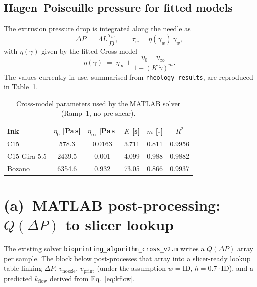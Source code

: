 \documentclass[11pt,a4paper]{article}
\begin{document}
\subsection{Hagen--Poiseuille pressure for fitted models}
The extrusion pressure drop is integrated along the needle as
\begin{equation}
\Delta P \;=\; 4 L \frac{\tau_w}{D}, \qquad
\tau_w = \eta(\dot\gamma_w)\,\dot\gamma_w,
\label{eq:HP}
\end{equation}
with $\eta(\dot\gamma)$ given by the fitted Cross model
\begin{equation}
\eta(\dot\gamma) \;=\; \eta_\infty + \frac{\eta_0-\eta_\infty}{1+(K\,\dot\gamma)^{m}}.
\label{eq:cross}
\end{equation}
The values currently in use, summarised from
\texttt{rheology\_results}, are reproduced in Table~\ref{tab:rheo_params}.

\begin{table}[h]
\centering
\small
\caption{Cross-model parameters used by the MATLAB solver (Ramp~1, no pre-shear).}
\label{tab:rheo_params}
\begin{tabular}{l c c c c c}
\toprule
Ink & $\eta_0$ [Pa\,s] & $\eta_\infty$ [Pa\,s] & $K$ [s] & $m$ [-] & $R^2$ \\
\midrule
C15            & 578.3   & 0.0163 & 3.711  & 0.811 & 0.9956 \\
C15 Gira 5.5   & 2439.5  & 0.001  & 4.099  & 0.988 & 0.9882 \\
Bozano         & 6354.6  & 0.932  & 73.05  & 0.866 & 0.9937 \\
\bottomrule
\end{tabular}
\end{table}

\section{(a)~MATLAB post-processing: \texorpdfstring{$Q(\Delta P)$}{Q(dP)} to slicer lookup}
\label{sec:matlab}

The existing solver \texttt{bioprinting\_algorithm\_cross\_v2.m} writes a
$Q(\Delta P)$ array per sample. The block below post-processes that array into a
slicer-ready lookup table linking $\Delta P$, $\bar v_\mathrm{nozzle}$,
$v_\mathrm{print}$ (under the assumption $w=\mathrm{ID}$, $h=0.7\cdot\mathrm{ID}$),
and a predicted $k_\mathrm{flow}$ derived from Eq.~\ref{eq:kflow}.
\end{document}
